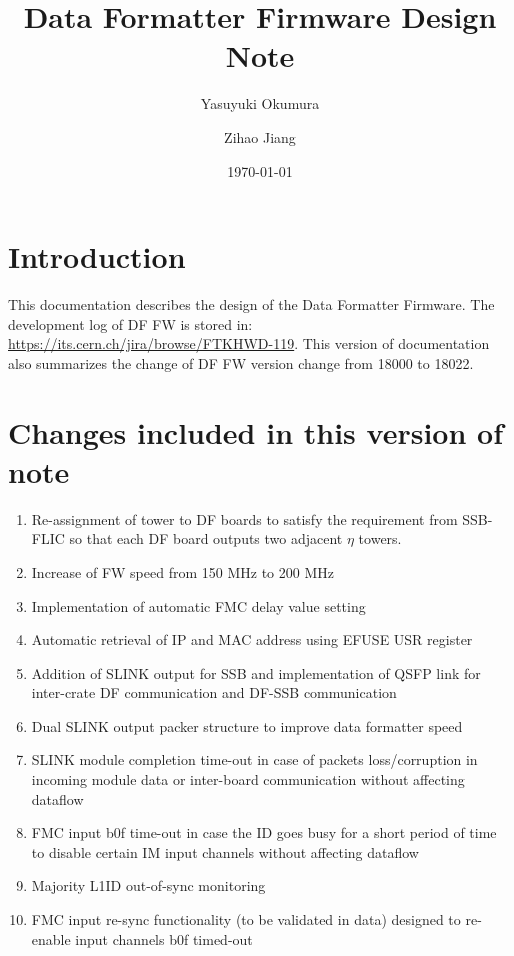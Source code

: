\documentclass[11pt,letterpaper]{article}
\title{\bf Data Formatter Firmware Design Note}
\author{Yasuyuki Okumura}
\affil{University of Chicago, Chicago, Illinois 60637, USA}
\author{Zihao Jiang}
\affil{Stanford University, Stanford, California, 94305, USA}
\date{\today}
\begin{document}
\maketitle

\begin{abstract}
\end{abstract}

\section{Introduction}

This documentation describes the design of the Data Formatter Firmware. 
The development log of DF FW is stored in: \url{https://its.cern.ch/jira/browse/FTKHWD-119}. This version of documentation also summarizes the change of DF FW version change from 18000 to 18022. 

\section{Changes included in this version of note}
\begin{enumerate}

 \item Re-assignment of tower to DF boards to satisfy the requirement from SSB-FLIC so that each DF board outputs two adjacent $\eta$ towers. 
 \item Increase of FW speed from 150 MHz to 200 MHz
 \item Implementation of automatic FMC delay value setting
 \item Automatic retrieval of IP and MAC address using EFUSE USR register
 \item Addition of SLINK output for SSB and implementation of QSFP link for inter-crate DF communication and DF-SSB communication
 \item Dual SLINK output packer structure to improve data formatter speed
 \item SLINK module completion time-out in case of packets loss/corruption in incoming module data or inter-board communication without affecting dataflow
 \item FMC input b0f time-out in case the ID goes busy for a short period of time to disable certain IM input channels without affecting dataflow
 \item Majority L1ID out-of-sync monitoring 
 \item FMC input re-sync functionality (to be validated in data) designed to re-enable input channels b0f timed-out 

\end{enumerate}
\end{document}
